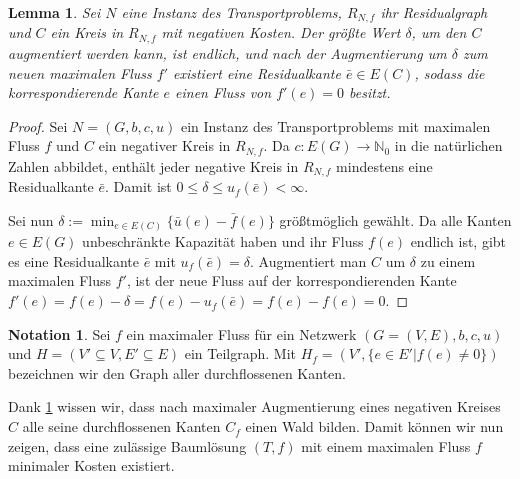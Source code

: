 \documentclass[a4paper,twoside,ngerman]{report}
\theoremstyle{plain}
\newtheorem{lem}[thm]{Lemma}
\theoremstyle{definition}
\newtheorem*{nota}{Notation}
\begin{document}
\begin{lem}\label{negKreis}Sei $N$ eine Instanz des Transportproblems, $R_{N,f}$ ihr Residualgraph und $C$ ein Kreis in $R_{N,f}$ mit negativen Kosten. Der größte Wert $\delta$, um den $C$ augmentiert werden kann, ist endlich, und nach der Augmentierung um $\delta$ zum neuen maximalen Fluss $f'$ existiert eine Residualkante $\bar{e}\in E(C)$, sodass die korrespondierende Kante $e$ einen Fluss von $f'(e)=0$ besitzt. 
\end{lem}
\begin{proof}Sei $N=(G,b,c,u)$ ein Instanz des Transportproblems mit maximalen Fluss $f$ und $C$ ein negativer Kreis in $R_{N,f}$. Da $c:E(G)\rightarrow\mathbb{N}_0$ in die natürlichen Zahlen abbildet, enthält jeder negative Kreis in $R_{N,f}$ mindestens eine Residualkante $\bar{e}$. Damit ist $0\leq\delta\leq u_f(\bar{e})<\infty$.

Sei nun $\delta:=\min_{e\in E(C)}\{\bar{u}(e)-\bar{f}(e)\}$ größtmöglich gewählt. Da alle Kanten $e\in E(G)$ unbeschränkte Kapazität haben und ihr Fluss $f(e)$ endlich ist, gibt es eine Residualkante $\bar{e}$ mit $u_f(\bar{e})=\delta$. Augmentiert man $C$ um $\delta$ zu einem maximalen Fluss $f'$, ist der neue Fluss auf der korrespondierenden Kante $f'(e)=f(e)-\delta=f(e)-u_f(\bar{e})=f(e)-f(e)=0$.\end{proof}

\begin{nota}Sei $f$ ein maximaler Fluss für ein Netzwerk $(G=(V,E),b,c,u)$ und $H=(V'\subseteq V, E'\subseteq E)$ ein Teilgraph. Mit $H_f=(V',\{e\in E' | f(e) \neq 0\})$ bezeichnen wir den Graph aller durchflossenen Kanten.\end{nota}

Dank \cref{negKreis} wissen wir, dass nach maximaler Augmentierung eines negativen Kreises $C$ alle seine durchflossenen Kanten $C_f$ einen Wald bilden. Damit können wir nun zeigen, dass eine zulässige Baumlösung $(T,f)$ mit einem maximalen Fluss $f$ minimaler Kosten existiert.
\end{document}
